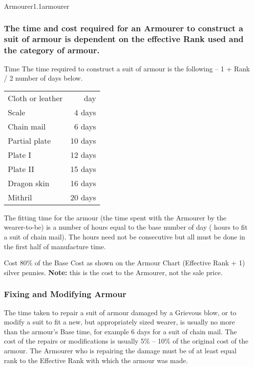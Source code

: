 \begin{skill}{Armourer}{1.1}{armourer}
\subsubsection{The time and cost required for an Armourer to construct
a suit of armour is dependent on the effective Rank used and the
category of armour.}

\begin{Description}
\item[Time]
The time required to construct a suit of armour is the following --
1 + Rank / 2 \x number of days below.

\begin{tabularx}{\linewidth}{Xr}
Cloth or leather  & \textonehalf{} day \\
Scale & 4 days \\
Chain mail & 6 days \\
Partial plate & 10 days \\
Plate I & 12 days \\
Plate II & 15 days \\
Dragon skin & 16 days \\
Mithril & 20 days \\
\end{tabularx}

The fitting time for the armour (the time spent with the Armourer by
the wearer-to-be) is a number of hours equal to the base number of day
( hours to fit a suit of chain mail).  The hours need not be
consecutive but all must be done in the first half of manufacture
time.

\item[Cost] 80\% of the Base Cost as shown on the Armour Chart \x
(Effective Rank + 1) silver pennies.  \textbf{Note:} this is the cost
to the Armourer, not the sale price.

\end{Description}

\subsubsection{Fixing and Modifying Armour}

The time taken to repair a suit of armour damaged by a Grievous blow,
or to modify a suit to fit a new, but appropriately sized wearer, is
usually no more than the armour's Base time, for example 6 days for a
suit of chain mail.  The cost of the repairs or modifications is
usually 5\% -- 10\% of the original cost of the armour.  The Armourer
who is repairing the damage must be of at least equal rank to the
Effective Rank with which the armour was made.


\end{skill}
